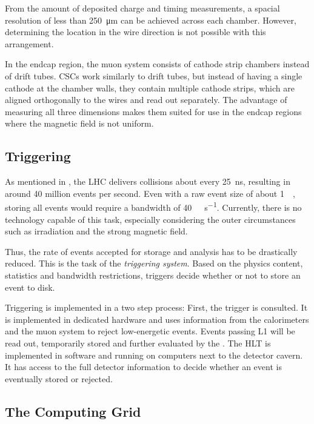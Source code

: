 From the amount of deposited charge and timing measurements, a spacial resolution of less than \SI{250}{\micro\meter} can be achieved across each chamber. However, determining the location in the wire direction is not possible with this arrangement.

In the endcap region, the muon system consists of cathode strip chambers instead of drift tubes. \acp{CSC} work similarly to drift tubes, but instead of having a single cathode at the chamber walls, they contain multiple cathode strips, which are aligned orthogonally to the wires and read out separately.
The advantage of measuring all three dimensions makes them suited for use in the endcap regions where the magnetic field is not uniform. 

\subsection{Triggering}
As mentioned in , the \ac{LHC} delivers collisions about every \SI{25}{\nano\second}, resulting in around \num{40} million events per second. Even with a raw event size of about \SI{1}{\mega\byte}, storing all events would require a bandwidth of \SI{40}{\tera\byte\per\second}. Currently, there is no technology capable of this task, especially considering the outer circumstances such as irradiation and the strong magnetic field.

Thus, the rate of events accepted for storage and analysis has to be drastically reduced. This is the task of the \emph{triggering system}. Based on the physics content, statistics and bandwidth restrictions, triggers decide whether or not to store an event to disk.

Triggering is implemented in a two step process: First, the  trigger is consulted. It is implemented in dedicated hardware and uses information from the calorimeters and the muon system to reject low-energetic events. Events passing \ac{L1} will be read out, temporarily stored and further evaluated by the . The \ac{HLT} is implemented in software and running on computers next to the detector cavern. It has access to the full detector information to decide whether an event is eventually stored or rejected.




\subsection{The Computing Grid}